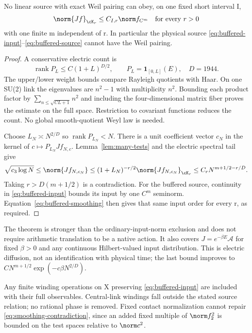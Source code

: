 \begin{theorem}\label{thm:smoothing-exclusion}
No linear source with exact Weil pairing can obey, on one fixed
short interval I,
\begin{equation}\label{eq:common-input-order}
\norm{Jf}_{\cK_r}\le C_{I,r}\norm f_{C^m}\quad\text{for every }r>0
\end{equation}
with one finite m independent of r. In particular the physical
source \eqref{eq:buffered-input}--\eqref{eq:buffered-source} cannot
have the Weil pairing.
\end{theorem}
\begin{proof}
A conservative electric count is
\begin{equation}\label{eq:ambient-count}
\operatorname{rank}P_L\le C(1+L)^{D/2},\qquad
P_L=\mathbf1_{[0,L]}(E),\quad D=1944.
\end{equation}
The upper/lower weight bounds compare Rayleigh quotients with Haar.
On one SU(2) link the eigenvalues are $n^2-1$ with multiplicity $n^2$.
Bounding each product factor by $\sum_{n\le\sqrt{CL+1}}n^2$ and
including the four-dimensional matrix fiber proves the estimate
on the full space. Restriction to covariant functions reduces the
count. No global smooth-quotient Weyl law is needed.

Choose $L_N\asymp N^{2/D}$ so $\operatorname{rank}P_{L_N}<N$.
There is a unit coefficient vector $c_N$ in the kernel of
$c\mapsto P_{L_N}Jf_{N,c}$. Lemma~\ref{lem:many-tests} and the
electric spectral tail give
\begin{equation}\label{eq:smoothing-contradiction}
\sqrt{c_3\log N}\le\norm{Jf_{N,c_N}}
\le(1+L_N)^{-r/2}\norm{Jf_{N,c_N}}_{\cK_r}
\le C_rN^{m+1/2-r/D}.
\end{equation}
Taking $r>D(m+1/2)$ is a contradiction. For the buffered source,
continuity in \eqref{eq:buffered-input} bounds its input by one
$C^m$ seminorm. Equation~\eqref{eq:buffered-smoothing} then gives
that same input order for every r, as required.
\end{proof}
The theorem is stronger than the ordinary-input-norm exclusion and
does not require arithmetic translation to be a native action.
It also covers $J=e^{-\beta E}\mathcal A$ for fixed $\beta>0$ and
any continuous Hilbert-valued input distribution. This is electric
diffusion, not an identification with physical time; the last bound
improves to $CN^{m+1/2}\exp(-c\beta N^{2/D})$.

Any finite winding operations on X preserving
\eqref{eq:buffered-input} are included with their full observables.
Central-link windings fall outside the stated source relation; no
rational phase is removed. Fixed contact normalization cannot repair
\eqref{eq:smoothing-contradiction}, since an added fixed multiple of
$\norm f_2^2$ is bounded on the test spaces relative to $\norm c^2$.

